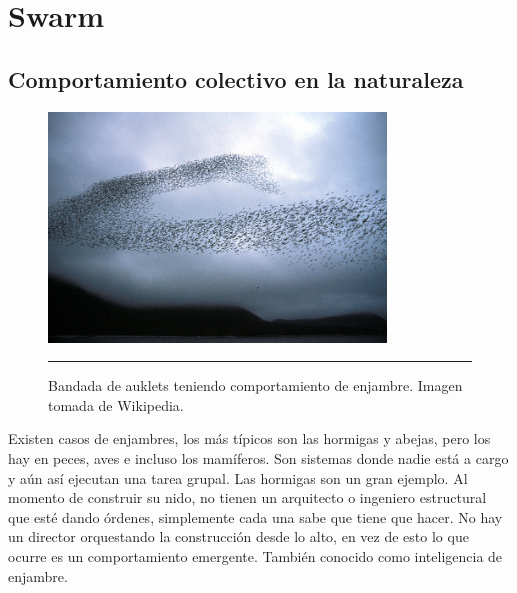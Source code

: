 
\chapter{Swarm} %

\label{Chapter2} %



\section{Comportamiento colectivo en la naturaleza}

\begin{figure}[htbp]
	\centering
		\includegraphics[width=0.8\textwidth]{./Figures/swarm.jpg}
		\rule{35em}{0.5pt}
	\caption[Bandada de auklets]{Bandada de auklets teniendo comportamiento de enjambre. Imagen tomada de Wikipedia.}
	\label{fig:Bandada}
\end{figure}

Existen casos de enjambres, los más típicos son las hormigas y abejas, pero los hay en peces, aves e incluso los mamíferos. Son sistemas donde nadie está a cargo y aún así ejecutan una tarea grupal. Las hormigas son un gran ejemplo. Al momento de construir su nido, no tienen un arquitecto o ingeniero estructural que esté dando órdenes, simplemente cada una sabe que tiene que hacer. No hay un director orquestando la construcción desde lo alto, en vez de esto lo que ocurre es un comportamiento emergente. También conocido como inteligencia de enjambre.

